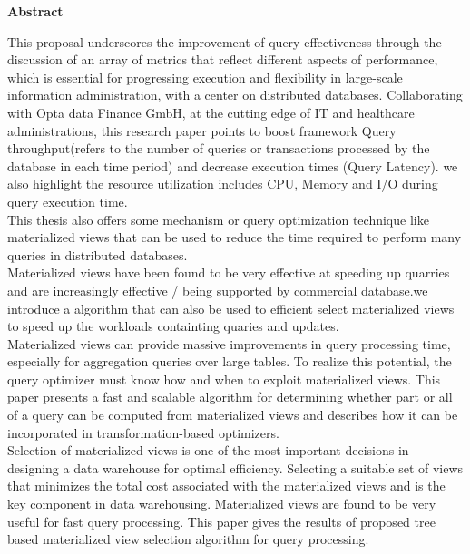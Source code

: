 \begin{center}
    \Large\textbf{Abstract}
\end{center}

\normalsize
This proposal underscores the improvement of query  effectiveness through  the  discussion of an array of metrics  that reflect different aspects of performance, which is  essential for progressing execution and flexibility  in large-scale information administration, with a center on  distributed  databases. Collaborating with Opta data Finance GmbH, at the cutting edge of IT and healthcare administrations, this research paper  points to boost framework Query  throughput(refers to the number of queries or transactions processed by the database in each time period) and decrease execution times (Query Latency). we also highlight the resource utilization  includes CPU, Memory and I/O during query execution time.\\
This  thesis also offers some  mechanism or query optimization technique like materialized views that can be used to reduce the time required to perform many queries in distributed databases.\\
Materialized views have been found to be very effective at speeding up quarries and are increasingly effective / being supported by commercial database.we introduce a algorithm that can also be used to efficient select materialized views to speed up the  workloads containting quaries and updates.\\
Materialized views can provide massive improvements in query processing time, especially for aggregation queries over large tables. To realize this potential, the query optimizer must know how and when to exploit materialized views. This paper presents a fast and scalable algorithm for determining whether part or all of a query can be computed from materialized views and describes how it can be incorporated in transformation-based optimizers.\\

Selection of materialized views is one of the most important decisions in designing a data warehouse for optimal efficiency. Selecting a suitable set of views that minimizes the total cost associated with the materialized views and is the key component in data warehousing. Materialized views are found to be very useful for fast query
processing. This paper gives the results of proposed tree based materialized view selection algorithm for
query processing.\\



